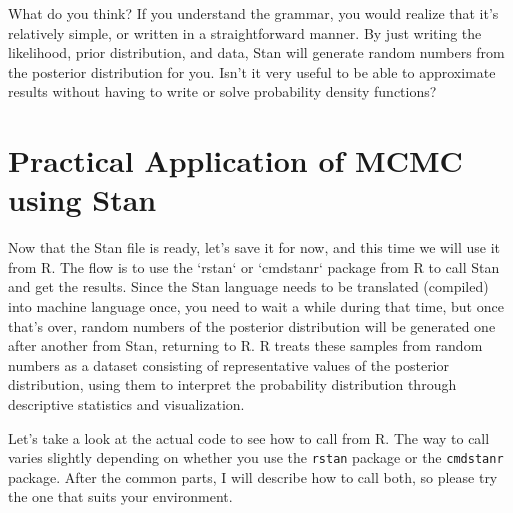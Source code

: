 \documentclass{ltjsbook}
\begin{document}
What do you think? If you understand the grammar, you would realize that it's relatively simple, or written in a straightforward manner. By just writing the likelihood, prior distribution, and data, Stan will generate random numbers from the posterior distribution for you. Isn't it very useful to be able to approximate results without having to write or solve probability density functions?
\section{Practical Application of MCMC using Stan}
Now that the Stan file is ready, let's save it for now, and this time we will use it from R.
The flow is to use the `rstan` or `cmdstanr` package from R to call Stan and get the results. Since the Stan language needs to be translated (compiled) into machine language once, you need to wait a while during that time, but once that's over, random numbers of the posterior distribution will be generated one after another from Stan, returning to R. R treats these samples from random numbers as a dataset consisting of representative values of the posterior distribution, using them to interpret the probability distribution through descriptive statistics and visualization.

Let's take a look at the actual code to see how to call from R. The way to call varies slightly depending on whether you use the \texttt{rstan} package or the \texttt{cmdstanr} package. After the common parts, I will describe how to call both, so please try the one that suits your environment.
\end{document}
